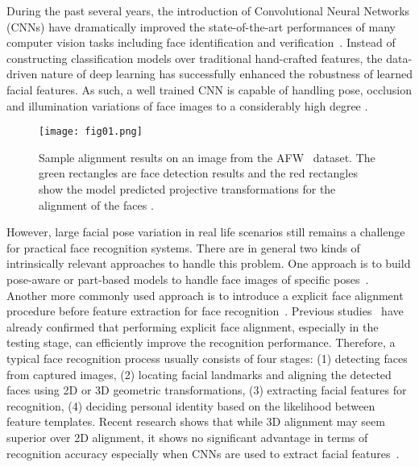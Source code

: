 \documentclass[10pt,twocolumn,letterpaper]{article}
\begin{document}
During the past several years, the introduction of Convolutional Neural Networks (CNNs) have dramatically improved the state-of-the-art performances of many computer vision tasks including face identification and verification~\cite{sun2013hybrid,sun2014deep,sun2015deepid3,taigman2014deepface,schroff2015facenet,parkhi2015deep,wen2016discriminative}.
Instead of constructing classification models over traditional hand-crafted features, the data-driven nature of deep learning has successfully enhanced the robustness of learned facial features. 
As such, a well trained CNN is capable of handling pose, occlusion and illumination variations of face images to a considerably high degree \cite{schroff2015facenet,parkhi2015deep,ding2016comprehensive}.

\begin{figure}[b]
\begin{center}
\texttt{[image: fig01.png]}
\end{center}
   \caption{Sample alignment results on an image from the AFW~\cite{Zhu2012Face} dataset. The green rectangles are face detection results and the red rectangles show the model predicted projective transformations for the alignment of the faces .}
\label{fig01}
\end{figure}

However, large facial pose variation in real life scenarios still remains a challenge for practical face recognition systems. 
There are in general two kinds of intrinsically relevant approaches to handle this problem.
One approach is to build pose-aware or part-based models to handle face images of specific poses~\cite{masi2016pose,liao2013partial}. 
Another more commonly used approach is to introduce a explicit face alignment procedure before feature extraction for face recognition~\cite{sun2014deep,hu2016face,taigman2014deepface,ding2016comprehensive}.  
Previous studies~\cite{schroff2015facenet,parkhi2015deep} have already confirmed that performing explicit face alignment, especially in the testing stage, can efficiently improve the recognition performance. 
Therefore, a typical face recognition process usually consists of four stages: (1) detecting faces from captured images, (2) locating facial landmarks and aligning the detected faces using 2D or 3D geometric transformations, (3) extracting facial features for recognition, (4) deciding personal identity based on the likelihood between feature templates. 
Recent research shows that while 3D alignment may seem superior over 2D alignment, it shows no significant advantage in terms of recognition accuracy especially when CNNs are used to extract facial features~\cite{banerjee2016frontalize}.
\end{document}
